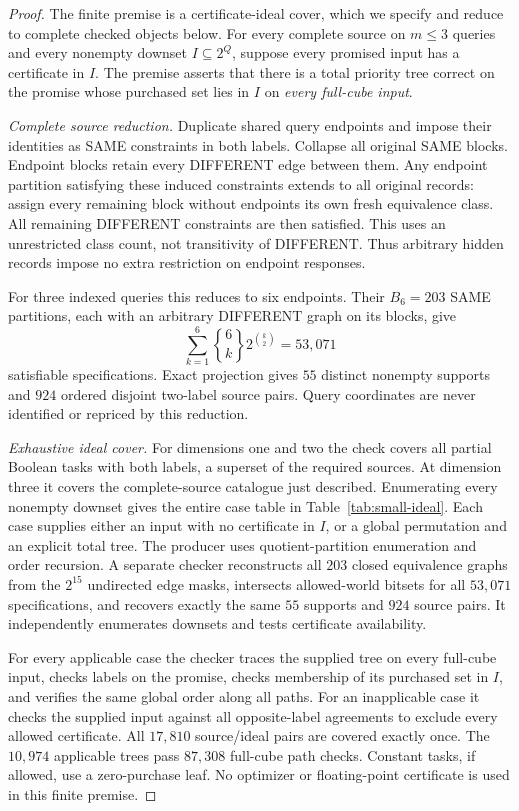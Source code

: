 \documentclass[pdflatex,sn-mathphys-num]{sn-jnl}
\theoremstyle{thmstyleone}
\theoremstyle{thmstylethree}
\theoremstyle{thmstyletwo}
\begin{document}
\begin{proof}
The finite premise is a certificate-ideal cover, which we specify and reduce to complete checked objects below. For every complete source on $m\leq3$ queries and every nonempty downset $I\subseteq2^Q$, suppose every promised input has a certificate in $I$. The premise asserts that there is a total priority tree correct on the promise whose purchased set lies in $I$ on \emph{every full-cube input}.

\emph{Complete source reduction.} Duplicate shared query endpoints and impose their identities as SAME constraints in both labels. Collapse all original SAME blocks. Endpoint blocks retain every DIFFERENT edge between them. Any endpoint partition satisfying these induced constraints extends to all original records: assign every remaining block without endpoints its own fresh equivalence class. All remaining DIFFERENT constraints are then satisfied. This uses an unrestricted class count, not transitivity of DIFFERENT. Thus arbitrary hidden records impose no extra restriction on endpoint responses.

For three indexed queries this reduces to six endpoints. Their $B_6=203$ SAME partitions, each with an arbitrary DIFFERENT graph on its blocks, give
\[
 \sum_{k=1}^{6}{6\brace k}2^{\binom{k}{2}}=53{,}071
\]
satisfiable specifications. Exact projection gives $55$ distinct nonempty supports and $924$ ordered disjoint two-label source pairs. Query coordinates are never identified or repriced by this reduction.

\emph{Exhaustive ideal cover.} For dimensions one and two the check covers all partial Boolean tasks with both labels, a superset of the required sources. At dimension three it covers the complete-source catalogue just described. Enumerating every nonempty downset gives the entire case table in Table~\ref{tab:small-ideal}. Each case supplies either an input with no certificate in $I$, or a global permutation and an explicit total tree. The producer uses quotient-partition enumeration and order recursion. A separate checker reconstructs all $203$ closed equivalence graphs from the $2^{15}$ undirected edge masks, intersects allowed-world bitsets for all $53{,}071$ specifications, and recovers exactly the same $55$ supports and $924$ source pairs. It independently enumerates downsets and tests certificate availability.

For every applicable case the checker traces the supplied tree on every full-cube input, checks labels on the promise, checks membership of its purchased set in $I$, and verifies the same global order along all paths. For an inapplicable case it checks the supplied input against all opposite-label agreements to exclude every allowed certificate. All $17{,}810$ source/ideal pairs are covered exactly once. The $10{,}974$ applicable trees pass $87{,}308$ full-cube path checks. Constant tasks, if allowed, use a zero-purchase leaf. No optimizer or floating-point certificate is used in this finite premise.


\end{proof}
\end{document}
